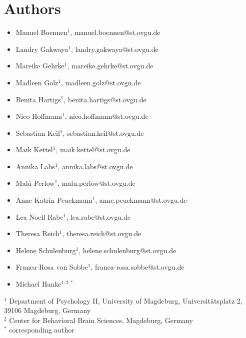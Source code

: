 \section*{Authors}

\begin{itemize}
\item Manuel Boennen$^{1}$, manuel.boennen@st.ovgu.de
\item Landry Gakwaya$^{1}$, landry.gakwaya@st.ovgu.de
\item Mareike Gehrke$^{1}$, mareike.gehrke@st.ovgu.de
\item Madleen Golz$^{1}$, madleen.golz@st.ovgu.de
\item Benita Hartigs$^{1}$, benita.hartigs@st.ovgu.de
\item Nico Hoffmann$^{1}$, nico.hoffmann@st.ovgu.de
\item Sebastian Keil$^{1}$, sebastian.keil@st.ovgu.de
\item Maik Kettel$^{1}$, maik.kettel@st.ovgu.de
\item Annika Labs$^{1}$, annika.labs@st.ovgu.de
\item Malú Perlow$^{1}$, malu.perlow@st.ovgu.de
\item Anne Katrin Peuckmann$^{1}$, anne.peuckmann@st.ovgu.de
\item Lea Noell Rabe$^{1}$, lea.rabe@st.ovgu.de
\item Theresa Reich$^{1}$, theresa.reich@st.ovgu.de
\item Helene Schulenburg$^{1}$, helene.schulenburg@st.ovgu.de
\item Franca-Rosa von Sobbe$^{1}$, franca-rosa.sobbe@st.ovgu.de
\item Michael Hanke$^{1,2,*}$
\end{itemize}

$^{1}$ Department of Psychology II, University of Magdeburg, Universitätsplatz 2, 39106 Magdeburg, Germany\\
$^{2}$ Center for Behavioral Brain Sciences, Magdeburg, Germany\\
$^{*}$ corresponding author